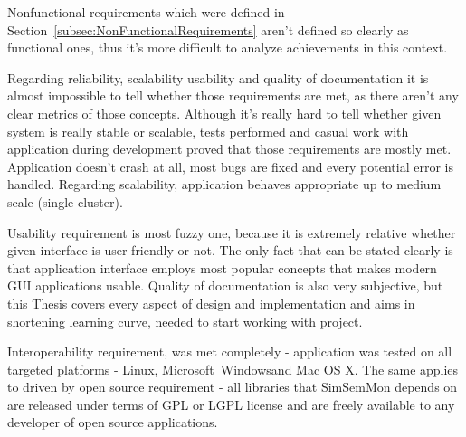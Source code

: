 Nonfunctional requirements which were defined in Section~\ref{subsec:NonFunctionalRequirements} aren\rq{}t defined so clearly as functional ones, thus it\rq{}s more difficult to analyze achievements in this context.  

Regarding reliability, scalability usability and quality of documentation it is almost impossible to tell whether those requirements are met, as there aren\rq{}t any clear metrics of those concepts. Although it\rq{}s really hard to tell whether given system is really stable or scalable, tests performed and casual work with application during development proved that those requirements are mostly met. Application doesn\rq{}t crash at all, most bugs are fixed and every potential error is handled. Regarding scalability, application behaves appropriate up to medium scale (single cluster). 

Usability requirement is most fuzzy one, because it is extremely relative whether given interface is user friendly or not. The only fact that can be stated clearly is that application interface employs most popular concepts that makes modern GUI applications usable. Quality of documentation is also very subjective, but this Thesis covers every aspect of design and implementation and aims in shortening learning curve, needed to start working with project.

Interoperability requirement, was met completely - application was tested on all targeted platforms - Linux, Microsoft\textregistered~Windows\textregistered and Mac OS X\textregistered. The same applies to driven by open source requirement - all libraries that SimSemMon depends on are released under terms of GPL or LGPL license and are freely available to any developer of open source applications.

